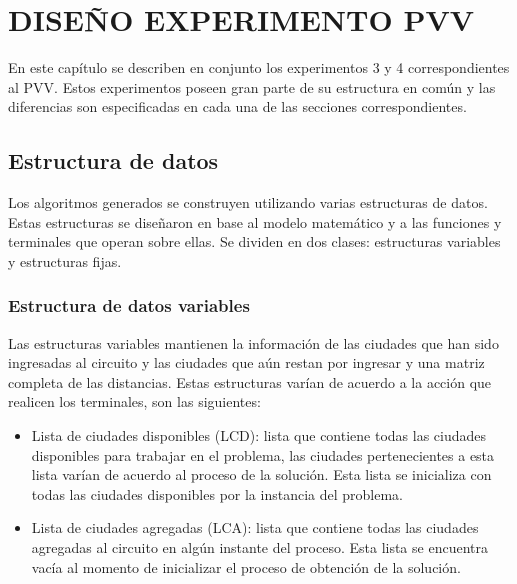 
\chapter{DISEÑO EXPERIMENTO PVV}
\label{cap:disegno_pvv}


En este capítulo se describen en conjunto los experimentos 3 y 4 correspondientes al PVV. Estos experimentos poseen gran parte de su estructura en común y las diferencias son especificadas en cada una de las secciones correspondientes.

\section{Estructura de datos}

Los algoritmos generados se construyen utilizando varias estructuras de datos. Estas estructuras se diseñaron en base al modelo matemático y a las funciones y terminales que operan sobre ellas. Se dividen en dos clases: estructuras variables y estructuras fijas.

\subsection{Estructura de datos variables}

Las estructuras variables mantienen la información de las ciudades que han sido ingresadas al circuito y las ciudades que aún restan por ingresar y una matriz completa de las distancias. Estas estructuras varían de acuerdo a la acción que realicen los terminales, son las siguientes:

\begin{itemize}
	\item Lista de ciudades disponibles (LCD): lista que contiene todas las ciudades disponibles para trabajar en el problema, las ciudades pertenecientes a esta lista varían de acuerdo al proceso de la solución. Esta lista se inicializa con todas las ciudades disponibles por la instancia del problema.
	\item Lista de ciudades agregadas (LCA): lista que contiene todas las ciudades agregadas al circuito en algún instante del proceso. Esta lista se encuentra vacía al momento de inicializar el proceso de obtención de la solución.
\end{itemize}

